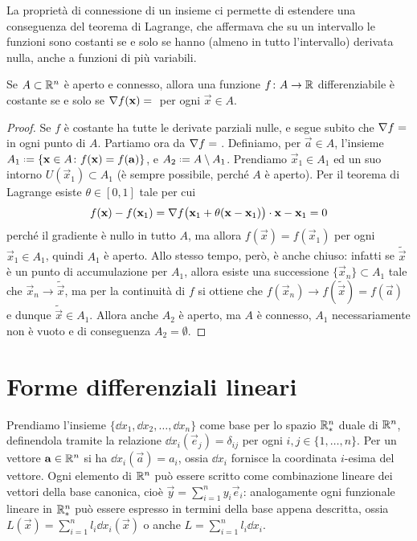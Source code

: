 La proprietà di connessione di un insieme ci permette di estendere una conseguenza del teorema di Lagrange, che affermava che su un intervallo le funzioni sono costanti se e solo se hanno (almeno in tutto l'intervallo) derivata nulla, anche a funzioni di più variabili.
\begin{corollario}
	Se $A\subset\mathbb{R}^n$ è aperto e connesso, allora una funzione $f\colon A\to\mathbb{R}$ differenziabile è costante se e solo se $\grad f(\vec x)=\null$ per ogni $\vec x\in A$.
\end{corollario}
\begin{proof}
	Se $f$ è costante ha tutte le derivate parziali nulle, e segue subito che $\grad f=\null$ in ogni punto di $A$.
	Partiamo ora da $\grad f=\null$. Definiamo, per $\vec a\in A$, l'insieme $A_1\defeq\{\vec x\in A\colon f(\vec x)=f(\vec a)\}$, e $A_2\defeq A\setminus A_1$.
	Prendiamo $\vec x_1\in A_1$ ed un suo intorno $U(\vec x_1)\subset A_1$ (è sempre possibile, perché $A$ è aperto).
	Per il teorema di Lagrange esiste $\theta\in[0,1]$ tale per cui
	\begin{equation*}
		f(\mathbf{x})-f(\mathbf{x}_1)={\nabla f\big(\mathbf{x}_1+\theta(\mathbf{x}-\mathbf{x}_1)\big)}\cdot{\mathbf{x}-\mathbf{x}_1}=0
	\end{equation*}
	perché il gradiente è nullo in tutto $A$, ma allora $f(\vec x)=f(\vec x_1)$ per ogni $\vec x_1\in A_1$, quindi $A_1$ è aperto.
	Allo stesso tempo, però, è anche chiuso: infatti se $\tilde{\vec x}$ è un punto di accumulazione per $A_1$, allora esiste una successione $\{\vec x_n\}\subset A_1$ tale che $\vec x_n\to\tilde{\vec x}$, ma per la continuità di $f$ si ottiene che $f(\vec x_n)\to f(\tilde{\vec x})=f(\vec a)$ e dunque $\tilde{\vec x}\in A_1$.
	Allora anche $A_2$ è aperto, ma $A$ è connesso, $A_1$ necessariamente non è vuoto e di conseguenza $A_2=\emptyset$.
\end{proof}

\section{Forme differenziali lineari}
Prendiamo l'insieme $\{\dd x_1,\dd x_2,\dots,\dd x_n\}$ come base per lo spazio $\mathbb{R}^n_*$ duale di $\mathbb{R}^n$, definendola tramite la relazione $\dd x_i(\vec e_j)=\delta_{ij}$ per ogni $i,j\in\{1,\dots,n\}$.
Per un vettore $\mathbf{a}\in\mathbb{R}^n$ si ha $\dd x_i(\vec a)=a_i$, ossia $\dd x_i$ fornisce la coordinata $i$-esima del vettore.
Ogni elemento di $\mathbb{R}^n$ può essere scritto come combinazione lineare dei vettori della base canonica, cioè $\vec y=\sum_{i=1}^ny_i\vec e_i$: analogamente ogni funzionale lineare in $\mathbb{R}^n_*$ può essere espresso in termini della base appena descritta, ossia $L(\vec x)=\sum_{i=1}^nl_i\dd x_i(\vec x)$ o anche $L=\sum_{i=1}^nl_i\dd x_i$.

